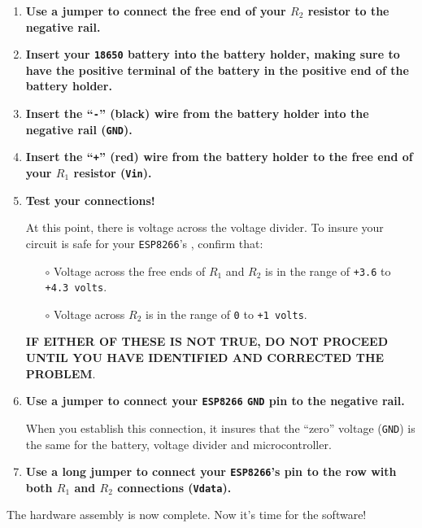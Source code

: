 \begin{enumerate}
	\item \textbf{Use a jumper to connect the free end of your $R_2$ resistor to the negative rail.}

	\item \textbf{Insert your \texttt{\texttt{18650}} battery into the battery holder, making sure to have the positive terminal of the battery in the positive end of the battery holder.}

	\item \textbf{Insert the ``\texttt{-}'' (black) wire from the battery holder into the negative rail  (\texttt{GND}).}

	\item \textbf{Insert the ``\texttt{+}'' (red) wire from the battery holder to the free end of your $R_1$ resistor  (\texttt{Vin}).}

	\item \textbf{Test your connections!}

	At this point, there is voltage across the voltage divider.
	To insure your circuit is safe for your \texttt{ESP8266}'s \adc, confirm that:
	\begin{itemize}
		\item[$\circ$] Voltage across the free ends of $R_1$ and $R_2$ is in the range of \texttt{+3.6} to \texttt{+4.3 volts}.
		\item[$\circ$] Voltage across $R_2$ is in the range of \texttt{0} to \texttt{+1 volts}.
	\end{itemize}
	\textbf{IF EITHER OF THESE IS NOT TRUE, DO NOT PROCEED UNTIL YOU HAVE IDENTIFIED AND CORRECTED THE PROBLEM}.

	\item \textbf{Use a jumper to connect your \texttt{ESP8266} \texttt{GND} pin to the negative rail.}

	When you establish this connection, it insures that the ``zero'' voltage (\texttt{GND}) is the same for the battery, voltage divider and microcontroller.

	\item \textbf{Use a long jumper to connect your \texttt{ESP8266}'s \adc pin to the row with both $R_1$ and $R_2$ connections (\texttt{Vdata}).}
\end{enumerate}

	The hardware assembly is now complete.
	Now it's time for the software!

